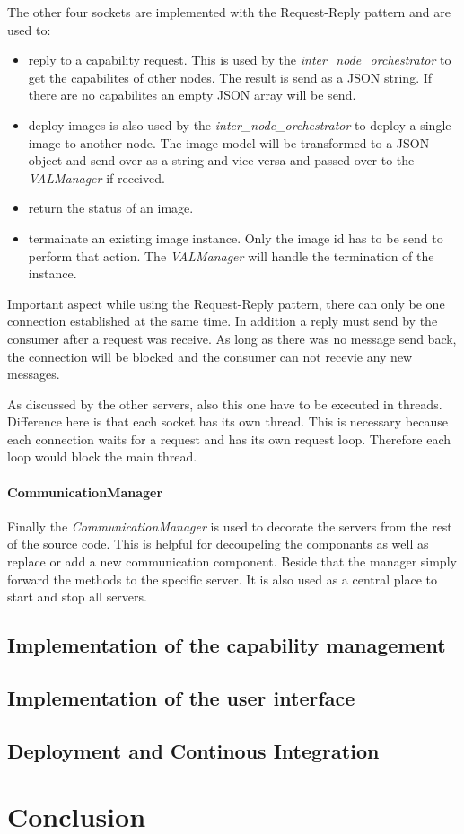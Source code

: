 The other four sockets are implemented with the Request-Reply pattern and are used to:
\begin{itemize}
  \item reply to a capability request.
  This is used by the \textit{inter\_node\_orchestrator} to get the capabilites of other nodes.
  The result is send as a \ac{JSON} string.
  If there are no capabilites an empty \ac{JSON} array will be send.
  \item deploy images is also used by the \textit{inter\_node\_orchestrator} to deploy a single image to another node.
  The image model will be transformed to a \ac{JSON} object and send over as a string and vice versa and passed over to the \textit{VALManager} if received.
  \item return the status of an image. 
  \item termainate an existing image instance.
  Only the image id has to be send to perform that action.
  The \textit{VALManager} will handle the termination of the instance.
\end{itemize}
Important aspect while using the Request-Reply pattern, there can only be one connection established at the same time.
In addition a reply must send by the consumer after a request was receive.
As long as there was no message send back, the connection will be blocked and the consumer can not recevie any new messages.

As discussed by the other servers, also this one have to be executed in threads.
Difference here is that each socket has its own thread.
This is necessary because each connection waits for a request and has its own request loop.
Therefore each loop would block the main thread.

\paragraph{CommunicationManager}
Finally the \textit{CommunicationManager} is used to decorate the servers from the rest of the source code.
This is helpful for decoupeling the componants as well as replace or add a new communication component.
Beside that the manager simply forward the methods to the specific server.
It is also used as a central place to start and stop all servers.

\subsection{Implementation of the capability management}
\doit

\subsection{Implementation of the user interface}
\doit

\subsection{Deployment and Continous Integration}

\doit

\section{Conclusion}
\doit
